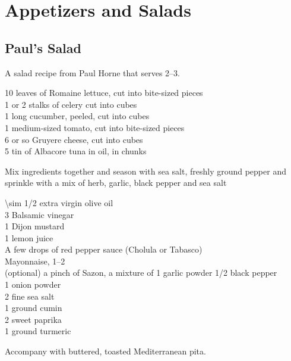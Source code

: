 \chapter{Appetizers and Salads}

\section{Paul's Salad}

\begin{open}
    A salad recipe from Paul Horne that serves \numrange{2}{3}.
\end{open}
\begin{ingredients}
    10 leaves of Romaine lettuce, cut into bite-sized pieces\\
    1 or 2 stalks of celery cut into cubes\\
    1 long cucumber, peeled, cut into cubes\\
    1 medium-sized tomato, cut into bite-sized pieces\\
    \SI{6}{\ounce} or so Gruyere cheese, cut into cubes\\
    \SI{5}{\ounce} tin of Albacore tuna in oil, in chunks
\end{ingredients}
Mix ingredients together and season with sea salt, freshly ground pepper and
sprinkle with a mix of herb, garlic, black pepper and sea salt


\begin{ingredients}
    \SI{\sim 1/2}{\cup} extra virgin olive oil\\
    \SI{3}{\tblspoon} Balsamic vinegar\\
    \SI{1}{\tblspoon} Dijon mustard\\
    \SI{1}{\tblspoon} lemon juice\\
    A few drops of red pepper sauce (Cholula or Tabasco)\\
    Mayonnaise, \SIrange[range-phrase={ or }]{1}{2}{\tblspoon}\\
    (optional) a pinch of Sazon, a mixture of \SI{1}{\tblspoon} garlic powder
    \SI{1/2}{\teaspoon} black pepper\\
    \SI{1}{\tblspoon} onion powder\\
    \SI{2}{\tblspoon} fine sea salt\\
    \SI{1}{\tblspoon} ground cumin\\
    \SI{2}{\tblspoon} sweet paprika\\
    \SI{1}{\tblspoon} ground turmeric
\end{ingredients}
Accompany with buttered, toasted Mediterranean pita.

